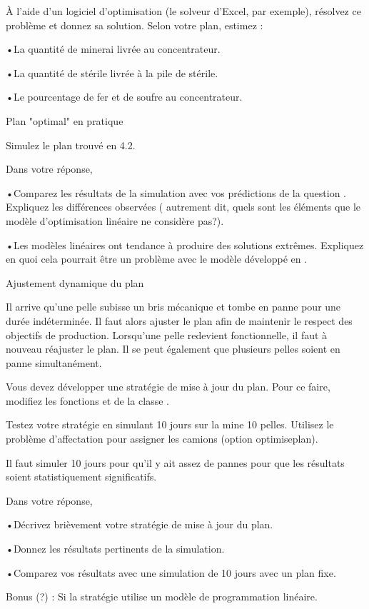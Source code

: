 À l'aide d'un logiciel d'optimisation (le solveur d'Excel, par exemple), résolvez ce problème et donnez sa solution. Selon votre plan, estimez :

•La quantité de minerai livrée au concentrateur.

•La quantité de stérile livrée à la pile de stérile.

•Le pourcentage de fer et de soufre au concentrateur.

Plan "optimal" en pratique

Simulez le plan trouvé en 4.2. 

Dans votre réponse, 

•Comparez les résultats de la simulation avec vos prédictions de la question . Expliquez les différences observées ( autrement dit, quels sont les éléments que le modèle d'optimisation linéaire ne considère pas?).

•Les modèles linéaires ont tendance à produire des solutions extrêmes. Expliquez en quoi cela pourrait être un problème avec le modèle développé en .

Ajustement dynamique du plan

Il arrive qu'une pelle subisse un bris mécanique et tombe en panne pour une durée indéterminée. Il faut alors ajuster le plan afin de maintenir le respect des objectifs de production. Lorsqu'une pelle redevient fonctionnelle, il faut à nouveau réajuster le plan. Il se peut également que plusieurs pelles soient en panne simultanément.

Vous devez développer une stratégie de mise à jour du plan. Pour ce faire, modifiez les fonctions et de la classe .

Testez votre stratégie en simulant 10 jours sur la mine 10 pelles. Utilisez le problème d'affectation pour assigner les camions (option optimiseplan).

Il faut simuler 10 jours pour qu'il y ait assez de pannes pour que les résultats soient statistiquement significatifs.

Dans votre réponse, 

•Décrivez brièvement votre stratégie de mise à jour du plan.

•Donnez les résultats pertinents de la simulation.

•Comparez vos résultats avec une simulation de 10 jours avec un plan fixe. 

Bonus (?) : Si la stratégie utilise un modèle de programmation linéaire.
